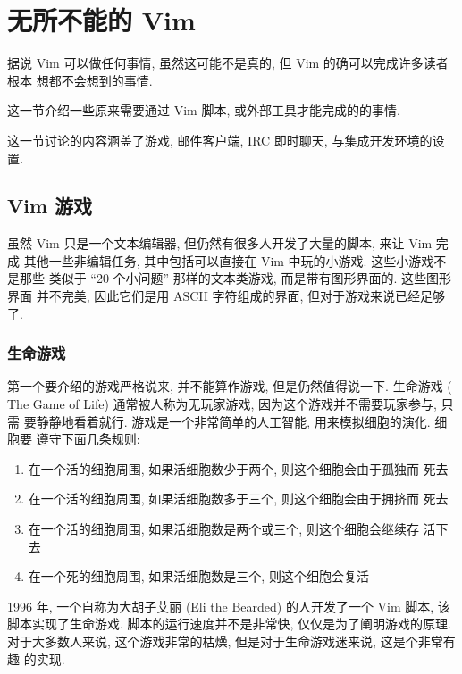 \chapter{无所不能的 Vim}
\label{chap:vim_can_do_everything}

据说 Vim 可以做任何事情, 虽然这可能不是真的, 但 Vim 的确可以完成许多读者根本
想都不会想到的事情.

这一节介绍一些原来需要通过 Vim 脚本, 或外部工具才能完成的的事情.

这一节讨论的内容涵盖了游戏, 邮件客户端, IRC 即时聊天, 与集成开发环境的设置.

\section{Vim 游戏}
\label{sec:vim_games}

虽然 Vim 只是一个文本编辑器, 但仍然有很多人开发了大量的脚本, 来让 Vim 完成
其他一些非编辑任务, 其中包括可以直接在 Vim 中玩的小游戏. 这些小游戏不是那些
类似于 ``20 个小问题'' 那样的文本类游戏, 而是带有图形界面的. 这些图形界面
并不完美, 因此它们是用 ASCII 字符组成的界面, 但对于游戏来说已经足够了.

\subsection{生命游戏}
\label{subsec:game_of_life}

第一个要介绍的游戏严格说来, 并不能算作游戏, 但是仍然值得说一下. 生命游戏 (
The Game of Life) 通常被人称为无玩家游戏, 因为这个游戏并不需要玩家参与, 只需
要静静地看着就行. 游戏是一个非常简单的人工智能, 用来模拟细胞的演化. 细胞要
遵守下面几条规则:
\begin{enumerate}
	\item 在一个活的细胞周围, 如果活细胞数少于两个, 则这个细胞会由于孤独而
		死去
	\item 在一个活的细胞周围, 如果活细胞数多于三个, 则这个细胞会由于拥挤而
		死去
	\item 在一个活的细胞周围, 如果活细胞数是两个或三个, 则这个细胞会继续存
		活下去
	\item 在一个死的细胞周围, 如果活细胞数是三个, 则这个细胞会复活
\end{enumerate}

1996 年, 一个自称为大胡子艾丽 (Eli the Bearded) 的人开发了一个 Vim 脚本, 该
脚本实现了生命游戏. 脚本的运行速度并不是非常快, 仅仅是为了阐明游戏的原理.
对于大多数人来说, 这个游戏非常的枯燥, 但是对于生命游戏迷来说, 这是个非常有趣
的实现.

